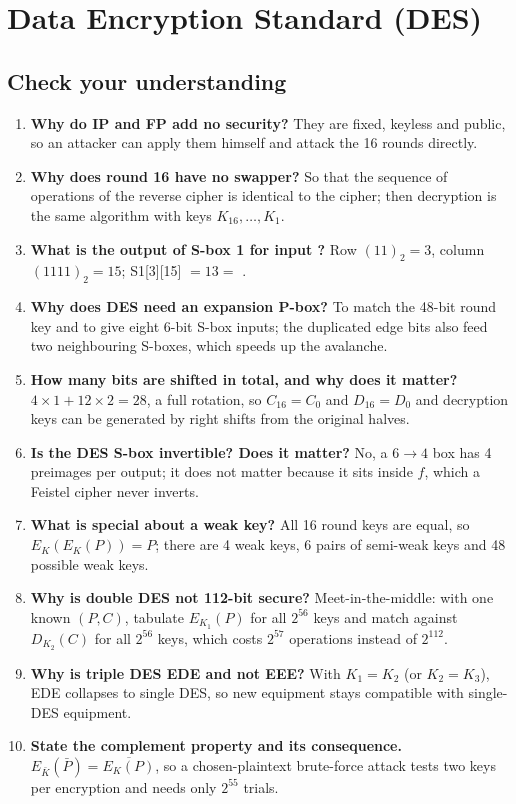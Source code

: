 \section{Data Encryption Standard (DES)}\label{q:15_des}

\subsection*{Check your understanding}
\begin{enumerate}[leftmargin=1.5em,itemsep=2pt]
  \item \textbf{Why do IP and FP add no security?} They are fixed, keyless and public, so an attacker can apply them himself and attack the 16 rounds directly.
  \item \textbf{Why does round 16 have no swapper?} So that the sequence of operations of the reverse cipher is identical to the cipher; then decryption is the same algorithm with keys $K_{16}, \dots, K_1$.
  \item \textbf{What is the output of S-box 1 for input ?} Row $(11)_2 = 3$, column $(1111)_2 = 15$; S1[3][15] $= 13 = $ .
  \item \textbf{Why does DES need an expansion P-box?} To match the 48-bit round key and to give eight 6-bit S-box inputs; the duplicated edge bits also feed two neighbouring S-boxes, which speeds up the avalanche.
  \item \textbf{How many bits are shifted in total, and why does it matter?} $4 \times 1 + 12 \times 2 = 28$, a full rotation, so $C_{16} = C_0$ and $D_{16} = D_0$ and decryption keys can be generated by right shifts from the original halves.
  \item \textbf{Is the DES S-box invertible? Does it matter?} No, a $6 \to 4$ box has 4 preimages per output; it does not matter because it sits inside $f$, which a Feistel cipher never inverts.
  \item \textbf{What is special about a weak key?} All 16 round keys are equal, so $E_K(E_K(P)) = P$; there are 4 weak keys, 6 pairs of semi-weak keys and 48 possible weak keys.
  \item \textbf{Why is double DES not 112-bit secure?} Meet-in-the-middle: with one known $(P, C)$, tabulate $E_{K_1}(P)$ for all $2^{56}$ keys and match against $D_{K_2}(C)$ for all $2^{56}$ keys, which costs $2^{57}$ operations instead of $2^{112}$.
  \item \textbf{Why is triple DES EDE and not EEE?} With $K_1 = K_2$ (or $K_2 = K_3$), EDE collapses to single DES, so new equipment stays compatible with single-DES equipment.
  \item \textbf{State the complement property and its consequence.} $E_{\bar K}(\bar P) = \overline{E_K(P)}$, so a chosen-plaintext brute-force attack tests two keys per encryption and needs only $2^{55}$ trials.
\end{enumerate}

